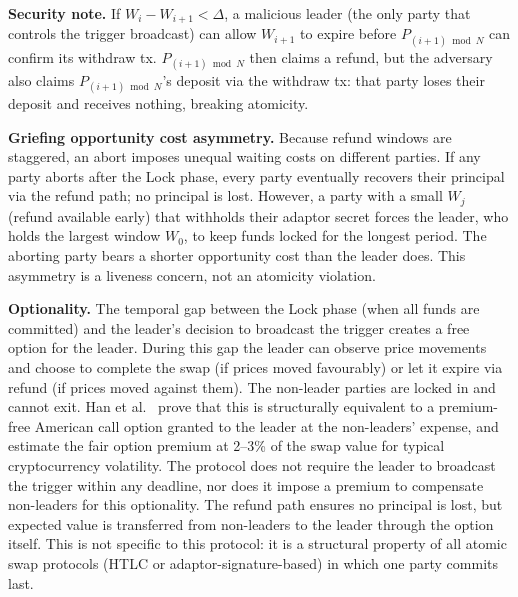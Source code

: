 \documentclass[11pt,a4paper,dvipsnames]{article}
\begin{document}
\medskip
\noindent\textbf{Security note.}\;
If $W_i - W_{i+1} < \Delta$, a malicious leader (the only party that
controls the trigger broadcast) can allow $W_{i+1}$ to expire before
$P_{(i+1)\bmod N}$ can confirm its withdraw tx.
$P_{(i+1)\bmod N}$ then claims a refund, but the adversary also claims
$P_{(i+1)\bmod N}$'s deposit via the withdraw tx: that party loses their
deposit and receives nothing, breaking atomicity.

\medskip
\noindent\textbf{Griefing opportunity cost asymmetry.}\;
Because refund windows are staggered, an abort imposes unequal waiting
costs on different parties.
If any party aborts after the Lock phase, every party eventually recovers
their principal via the refund path; no principal is lost.
However, a party with a small $W_j$ (refund available early) that withholds
their adaptor secret forces the leader, who holds the largest window $W_0$,
to keep funds locked for the longest period.
The aborting party bears a shorter opportunity cost than the leader does.
This asymmetry is a liveness concern, not an atomicity violation.

\medskip
\noindent\textbf{Optionality.}\;
The temporal gap between the Lock phase (when all funds are committed) and
the leader's decision to broadcast the trigger creates a free option for
the leader.
During this gap the leader can observe price movements and choose to
complete the swap (if prices moved favourably) or let it expire via refund
(if prices moved against them).
The non-leader parties are locked in and cannot exit.
Han et al.~\cite{han2019optionality} prove that this is structurally
equivalent to a premium-free American call option granted to the leader at
the non-leaders' expense, and estimate the fair option premium at 2--3\%
of the swap value for typical cryptocurrency volatility.
The protocol does not require the leader to broadcast the trigger within
any deadline, nor does it impose a premium to compensate non-leaders for
this optionality.
The refund path ensures no principal is lost, but expected value is
transferred from non-leaders to the leader through the option itself.
This is not specific to this protocol: it is a structural property of all
atomic swap protocols (HTLC or adaptor-signature-based) in which one party
commits last.
\end{document}
